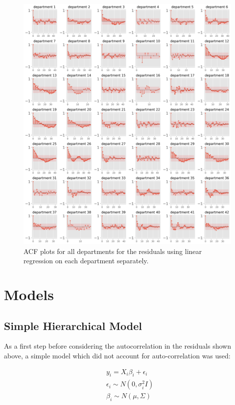\documentclass[paper=a4, fontsize=11pt]{scrartcl}
\begin{document}
\begin{figure}[h]\label{autocorr}
\centering
\includegraphics[width=1\textwidth]{acf_plots1.png}
\caption{ACF plots for all departments for the residuals using linear regression on each department separately.}
\end{figure}

\section{Models}
\subsection{Simple Hierarchical Model}
As a first step before considering the autocorrelation in the residuals shown above, a simple model which did not account for auto-correlation was used:


\begin{align*}
    &y_i = X_i \beta_i+ \epsilon_i \\
     &\epsilon_i \sim N(0, \sigma^2_i I)\\
      &\beta_i \sim N(\mu, \Sigma)
\end{align*}
\end{document}
